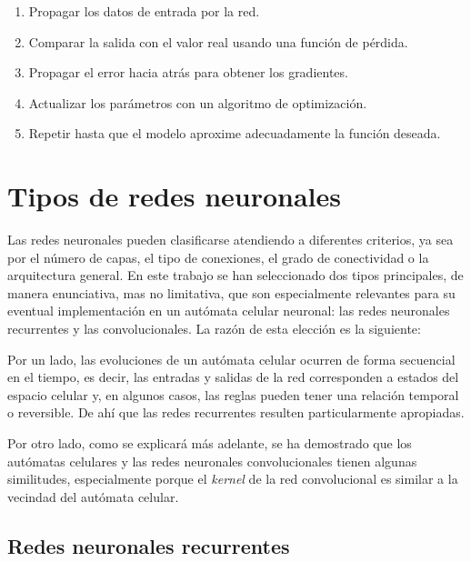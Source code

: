 \begin{enumerate}
	
	\item Propagar los datos de entrada por la red.
	
	\item Comparar la salida con el valor real usando una función de pérdida.
	
	\item Propagar el error hacia atrás para obtener los gradientes.
	
	\item Actualizar los parámetros con un algoritmo de optimización.
	
	\item Repetir hasta que el modelo aproxime adecuadamente la función deseada.
	
\end{enumerate}

\section{Tipos de redes neuronales}

Las redes neuronales pueden clasificarse atendiendo a diferentes criterios, ya sea por el número de capas, el tipo de conexiones, el grado de conectividad o la arquitectura general. En este trabajo se han seleccionado dos tipos principales, de manera enunciativa, mas no limitativa, que son especialmente relevantes para su eventual implementación en un autómata celular neuronal: las redes neuronales recurrentes y las convolucionales. La razón de esta elección es la siguiente:

Por un lado, las evoluciones de un autómata celular ocurren de forma secuencial en el tiempo, es decir, las entradas y salidas de la red corresponden a estados del espacio celular y, en algunos casos, las reglas pueden tener una relación temporal o reversible. De ahí que las redes recurrentes resulten particularmente apropiadas.

Por otro lado, como se explicará más adelante, se ha demostrado que los autómatas celulares y las redes neuronales convolucionales tienen algunas similitudes, especialmente porque el \textit{kernel} de la red convolucional es similar a la vecindad del autómata celular.

\subsection{Redes neuronales recurrentes}

